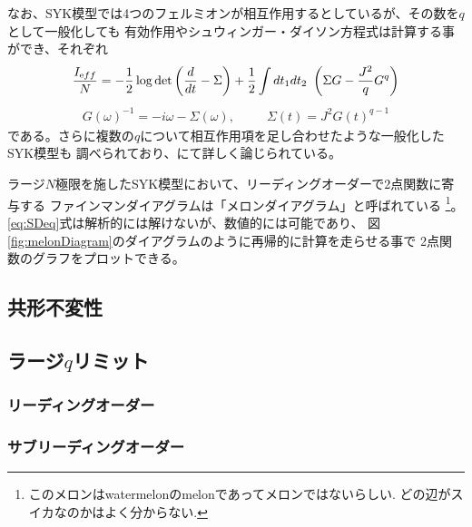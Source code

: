 なお、SYK模型では4つのフェルミオンが相互作用するとしているが、その数を$q$として一般化しても
有効作用やシュウィンガー・ダイソン方程式は計算する事ができ、それぞれ
\begin{align}
  \frac{I_{\mathrm eff}}{N} =
		- \frac{1}{2}\log\det\left(\frac{d}{dt} - \Sigma\right)
		+ \frac{1}{2}\int dt_1dt_2\ \left(\Sigma G - \frac{J^2}{q}G^q\right)
  \label{eq:effectiveActionWithGeneral_q}
\end{align}
\begin{align}
  G(\omega)^{-1} = -i\omega - \Sigma(\omega),
  \hspace{30pt}
  \Sigma(t) = J^2G(t)^{q-1}
  \label{eq:SDeqWithGeneral_q}
\end{align}
である。さらに複数の$q$について相互作用項を足し合わせたような一般化したSYK模型も
調べられており、\cite{gross}にて詳しく論じられている。

ラージ$N$極限を施したSYK模型において、リーディングオーダーで2点関数に寄与する
ファインマンダイアグラムは「メロンダイアグラム」と呼ばれている
\footnote{このメロンはwatermelonのmelonであってメロンではないらしい.
どの辺がスイカなのかはよく分からない.}。
\eqref{eq:SDeq}式は解析的には解けないが、数値的には可能であり、
図\ref{fig:melonDiagram}のダイアグラムのように再帰的に計算を走らせる事で
2点関数のグラフをプロットできる。

\subsection{共形不変性}

\subsection{ラージ$q$リミット}

\subsubsection{リーディングオーダー}

\subsubsection{サブリーディングオーダー}





\pagebreak
